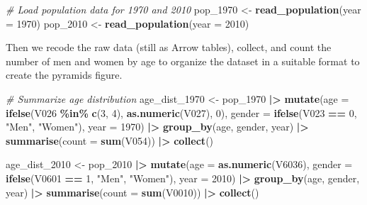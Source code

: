 \documentclass[
]{article}
\newenvironment{Shaded}{\begin{snugshade}}{\end{snugshade}}
\newcommand{\AttributeTok}[1]{\textcolor[rgb]{0.13,0.29,0.53}{#1}}
\newcommand{\CommentTok}[1]{\textcolor[rgb]{0.56,0.35,0.01}{\textit{#1}}}
\newcommand{\DecValTok}[1]{\textcolor[rgb]{0.00,0.00,0.81}{#1}}
\newcommand{\FunctionTok}[1]{\textcolor[rgb]{0.13,0.29,0.53}{\textbf{#1}}}
\newcommand{\NormalTok}[1]{#1}
\newcommand{\OtherTok}[1]{\textcolor[rgb]{0.56,0.35,0.01}{#1}}
\newcommand{\SpecialCharTok}[1]{\textcolor[rgb]{0.81,0.36,0.00}{\textbf{#1}}}
\newcommand{\StringTok}[1]{\textcolor[rgb]{0.31,0.60,0.02}{#1}}
\begin{document}
\begin{Shaded}
\begin{Highlighting}[]
\CommentTok{\# Load population data for 1970 and 2010}
\NormalTok{pop\_1970 }\OtherTok{\textless{}{-}} \FunctionTok{read\_population}\NormalTok{(}\AttributeTok{year =} \DecValTok{1970}\NormalTok{)}
\NormalTok{pop\_2010 }\OtherTok{\textless{}{-}} \FunctionTok{read\_population}\NormalTok{(}\AttributeTok{year =} \DecValTok{2010}\NormalTok{)}
\end{Highlighting}
\end{Shaded}

Then we recode the raw data (still as Arrow tables), collect, and count
the number of men and women by age to organize the dataset in a suitable
format to create the pyramids figure.

\begin{Shaded}
\begin{Highlighting}[]
\CommentTok{\# Summarize age distribution}
\NormalTok{age\_dist\_1970 }\OtherTok{\textless{}{-}}\NormalTok{ pop\_1970 }\SpecialCharTok{|\textgreater{}}
        \FunctionTok{mutate}\NormalTok{(}\AttributeTok{age    =} \FunctionTok{ifelse}\NormalTok{(V026 }\SpecialCharTok{\%in\%} \FunctionTok{c}\NormalTok{(}\DecValTok{3}\NormalTok{, }\DecValTok{4}\NormalTok{), }
                               \FunctionTok{as.numeric}\NormalTok{(V027), }\DecValTok{0}\NormalTok{),}
               \AttributeTok{gender =} \FunctionTok{ifelse}\NormalTok{(V023 }\SpecialCharTok{==} \DecValTok{0}\NormalTok{, }\StringTok{"Men"}\NormalTok{, }\StringTok{"Women"}\NormalTok{),}
               \AttributeTok{year   =} \DecValTok{1970}\NormalTok{) }\SpecialCharTok{|\textgreater{}}
        \FunctionTok{group\_by}\NormalTok{(age, gender, year) }\SpecialCharTok{|\textgreater{}}
        \FunctionTok{summarise}\NormalTok{(}\AttributeTok{count =} \FunctionTok{sum}\NormalTok{(V054)) }\SpecialCharTok{|\textgreater{}}
        \FunctionTok{collect}\NormalTok{()}

\NormalTok{age\_dist\_2010 }\OtherTok{\textless{}{-}}\NormalTok{ pop\_2010 }\SpecialCharTok{|\textgreater{}}
        \FunctionTok{mutate}\NormalTok{(}\AttributeTok{age    =} \FunctionTok{as.numeric}\NormalTok{(V6036),}
               \AttributeTok{gender =} \FunctionTok{ifelse}\NormalTok{(V0601  }\SpecialCharTok{==} \DecValTok{1}\NormalTok{, }\StringTok{"Men"}\NormalTok{, }\StringTok{"Women"}\NormalTok{),}
               \AttributeTok{year   =} \DecValTok{2010}\NormalTok{) }\SpecialCharTok{|\textgreater{}}
        \FunctionTok{group\_by}\NormalTok{(age, gender, year) }\SpecialCharTok{|\textgreater{}}
        \FunctionTok{summarise}\NormalTok{(}\AttributeTok{count =} \FunctionTok{sum}\NormalTok{(V0010)) }\SpecialCharTok{|\textgreater{}}
        \FunctionTok{collect}\NormalTok{()}


\end{Highlighting}
\end{Shaded}
\end{document}
